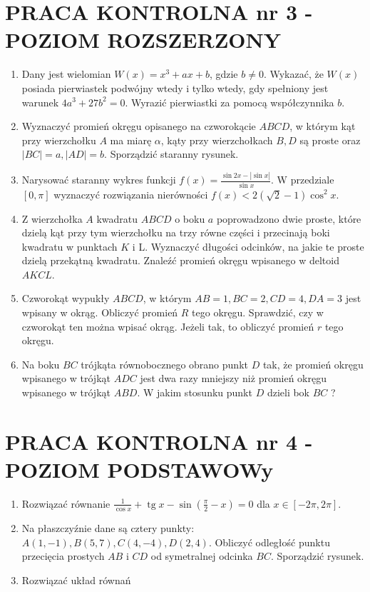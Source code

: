 \documentclass[10pt]{article}
\begin{document}
\section*{PRACA KONTROLNA nr 3 - POZIOM ROZSZERZONY}
\begin{enumerate}
  \item Dany jest wielomian $W(x)=x^{3}+a x+b$, gdzie $b \neq 0$. Wykazać, że $W(x)$ posiada pierwiastek podwójny wtedy i tylko wtedy, gdy spełniony jest warunek $4 a^{3}+27 b^{2}=0$. Wyrazić pierwiastki za pomocą współczynnika $b$.
  \item Wyznaczyć promień okręgu opisanego na czworokącie $A B C D$, w którym kąt przy wierzchołku $A$ ma miarę $\alpha$, kąty przy wierzchołkach $B, D$ są proste oraz $|B C|=a,|A D|=b$. Sporządzić staranny rysunek.
  \item Narysować staranny wykres funkcji $f(x)=\frac{\sin 2 x-|\sin x|}{\sin x}$. W przedziale $[0, \pi]$ wyznaczyć rozwiązania nierówności $f(x)<2(\sqrt{2}-1) \cos ^{2} x$.
  \item Z wierzchołka $A$ kwadratu $A B C D$ o boku $a$ poprowadzono dwie proste, które dzielą kąt przy tym wierzchołku na trzy równe części i przecinają boki kwadratu w punktach $K$ i L. Wyznaczyć długości odcinków, na jakie te proste dzielą przekątną kwadratu. Znaleźć promień okręgu wpisanego w deltoid $A K C L$.
  \item Czworokąt wypukły $A B C D$, w którym $A B=1, B C=2, C D=4, D A=3$ jest wpisany w okrąg. Obliczyć promień $R$ tego okręgu. Sprawdzić, czy w czworokąt ten można wpisać okrąg. Jeżeli tak, to obliczyć promień $r$ tego okręgu.
  \item Na boku $B C$ trójkąta równobocznego obrano punkt $D$ tak, że promień okręgu wpisanego w trójkąt $A D C$ jest dwa razy mniejszy niż promień okręgu wpisanego w trójkąt $A B D$. W jakim stosunku punkt $D$ dzieli bok $B C$ ?
\end{enumerate}

\section*{PRACA KONTROLNA nr 4 - POZIOM PODSTAWOWy}
\begin{enumerate}
  \item Rozwiązać równanie $\frac{1}{\cos x}+\operatorname{tg} x-\sin \left(\frac{\pi}{2}-x\right)=0$ dla $x \in[-2 \pi, 2 \pi]$.
  \item Na płaszczyźnie dane są cztery punkty: $A(1,-1), B(5,7), C(4,-4), D(2,4)$. Obliczyć odległość punktu przecięcia prostych $A B$ i $C D$ od symetralnej odcinka $B C$. Sporządzić rysunek.
  \item Rozwiązać układ równań
\end{enumerate}
\end{document}
